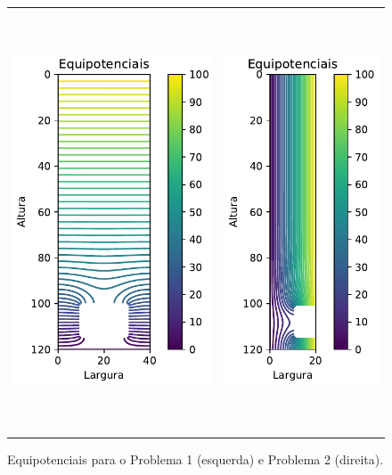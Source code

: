 \documentclass{aleph-revista}
\begin{document}
\begin{figure}[!ht]
  \centering
  \begin{tabular}{cc}
    \includegraphics[height=125mm]{p1_equipotenciais} &
    \includegraphics[height=125mm]{p2_equipotenciais}
  \end{tabular}
  \caption{Equipotenciais para o Problema 1 (esquerda) e Problema 2 (direita).}
  \label{fig:pot}
\end{figure}
\end{document}
